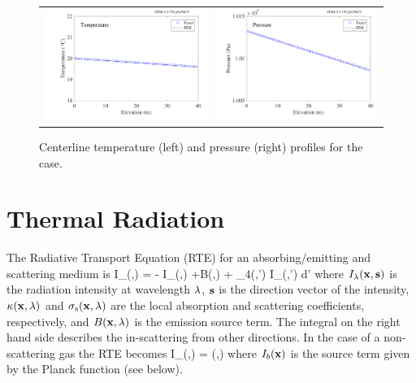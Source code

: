 \documentclass[11pt]{book}
\begin{document}
\begin{figure}[ht]
\begin{tabular*}{\textwidth}{lr}
\includegraphics[width=3.2in]{SCRIPT_FIGURES/lapse_rate_T} &
\includegraphics[width=3.2in]{SCRIPT_FIGURES/lapse_rate_P}
\end{tabular*}
\caption[The  test case]{Centerline temperature (left) and pressure (right) profiles for the  case.}
\label{lapse_rate}
\end{figure}


\chapter{Thermal Radiation}

The Radiative Transport Equation (RTE) for an absorbing/emitting
and scattering medium is
\be \bs \cdot \nabla I_{\la}(\bx,\bs) =
 - \;
I_\la(\bx,\bs) +B(\bx,\la) + 
\int_{4\pi}\Phi(\bs,\bs') \; I_{\la}(\bx,\bs') \; d\bs'
\label{RTEbasic} \ee
where $I_{\lambda}({\mathbf{x}},{\mathbf{s}})$ is the radiation intensity at wavelength
$\lambda$, ${\mathbf{s}}$ is the direction vector of the intensity,
$\kappa({\mathbf{x}},\lambda)$ and $\sigma_{\rm s}({\mathbf{x}},\lambda)$ are the local absorption
and scattering coefficients,
respectively, and $B({\mathbf{x}},\lambda)$ is the emission source term.
The integral on the
right hand side describes the in-scattering from other directions.
In the case of a non-scattering gas the RTE becomes
\be \bs \cdot \nabla I_{\la}(\bx,\bs) = \kappa(\bx,\la) \; \Big[ I_b(\bx)
- I_\la(\bx,\bs) \Big] \label{RTE} \ee
where $I_b({\mathbf{x}})$ is the source term given by the Planck function (see below).
\end{document}
